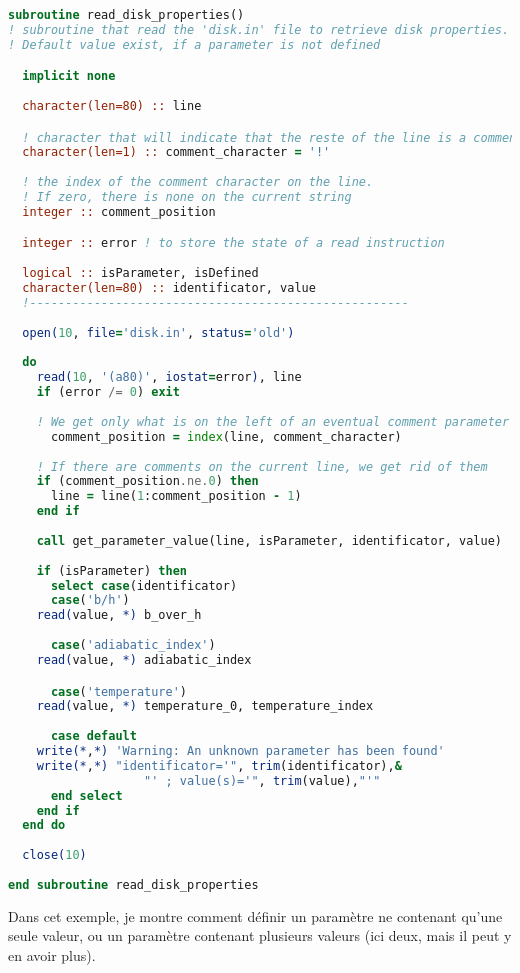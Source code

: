 \begin{lstlisting}[language=Fortran]
subroutine read_disk_properties()
! subroutine that read the 'disk.in' file to retrieve disk properties. 
! Default value exist, if a parameter is not defined

  implicit none
  
  character(len=80) :: line

  ! character that will indicate that the reste of the line is a comment
  character(len=1) :: comment_character = '!' 
  
  ! the index of the comment character on the line. 
  ! If zero, there is none on the current string
  integer :: comment_position 

  integer :: error ! to store the state of a read instruction
  
  logical :: isParameter, isDefined
  character(len=80) :: identificator, value
  !-----------------------------------------------------
  
  open(10, file='disk.in', status='old')
  
  do
    read(10, '(a80)', iostat=error), line
    if (error /= 0) exit
      
    ! We get only what is on the left of an eventual comment parameter
      comment_position = index(line, comment_character)
    
    ! If there are comments on the current line, we get rid of them
    if (comment_position.ne.0) then
      line = line(1:comment_position - 1)
    end if
    
    call get_parameter_value(line, isParameter, identificator, value)
      
    if (isParameter) then
      select case(identificator)
      case('b/h')
	read(value, *) b_over_h
      
      case('adiabatic_index')
	read(value, *) adiabatic_index

      case('temperature')
	read(value, *) temperature_0, temperature_index
	
      case default
	write(*,*) 'Warning: An unknown parameter has been found'
	write(*,*) "identificator='", trim(identificator),&
                   "' ; value(s)='", trim(value),"'"
      end select
    end if
  end do
  
  close(10)
    
end subroutine read_disk_properties
\end{lstlisting}

Dans cet exemple, je montre comment définir un paramètre ne contenant qu'une seule valeur, ou un paramètre contenant plusieurs valeurs (ici deux, mais il peut y en avoir plus). 

